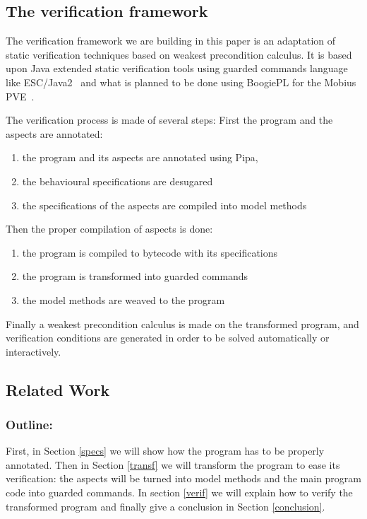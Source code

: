 \subsection{The verification framework}
\label{framework}
The verification framework we are building in this paper is an
adaptation of static verification techniques based on weakest
precondition calculus. It is based upon Java extended static verification
tools using guarded commands language like ESC/Java2~\cite{CokK04} and
what is planned to be done using BoogiePL for the Mobius
PVE~\cite{MobiusPVE07}.


The verification process is made of several steps:
First the program and the aspects are annotated:
\begin{enumerate}
\item the program and its aspects are annotated using Pipa,
\item the behavioural specifications are desugared
\item the specifications of the aspects are compiled into model
methods
\end{enumerate}
Then the proper compilation of aspects is done:
\begin{enumerate}
\item the program is compiled to bytecode with its specifications
\item the program is transformed into guarded commands
\item the model methods are weaved to the program
\end{enumerate}
Finally a weakest precondition calculus is made on the transformed
program, and verification conditions are generated in order to be
solved automatically or interactively.

\subsection{Related Work}
\label{related}



\subsubsection{Outline:}
First, in Section \ref{specs} we will show how the program has to be
 properly annotated. Then in Section \ref{transf} we will
transform the program to ease its verification: the aspects will be turned
into model methods and the main program code into guarded commands.
In section \ref{verif} we will explain how to verify the transformed program
and finally give a conclusion in Section \ref{conclusion}.

